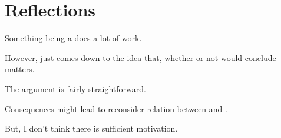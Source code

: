 \section{Reflections}
\label{sec:reflections}

\begin{note}
  Something being a \requ{} does a lot of work.

  However, just comes down to the idea that, whether or not would conclude matters.

  The argument is fairly straightforward.

  Consequences might lead to reconsider relation between \qzS{} and \qWhy{}.

  But, I don't think there is sufficient motivation.
\end{note}

